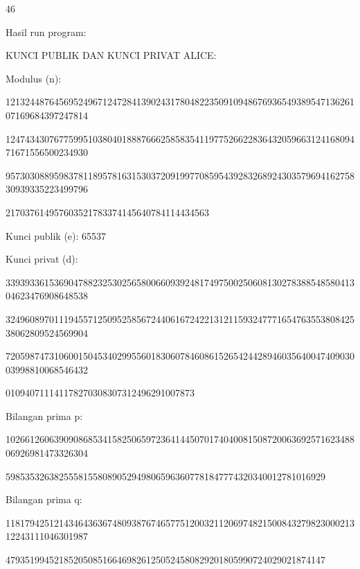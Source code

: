 \documentclass{article}
\begin{document}

46

Hasil run program:

KUNCI PUBLIK DAN KUNCI PRIVAT ALICE:

Modulus (n): 

12132448764569524967124728413902431780482235091094867693654938954713626107169684397247814

12474343076775995103804018887666258583541197752662283643205966312416809471671556500234930

95730308895983781189578163153037209199770859543928326892430357969416275830939335223499796

217037614957603521783374145640784114434563

Kunci publik (e): 65537

Kunci privat (d): 

33939336153690478823253025658006609392481749750025060813027838854858041304623476908648538

32496089701119455712509525856724406167242213121159324777165476355380842538062809524569904

72059874731060015045340299556018306078460861526542442894603564004740903003998810068546432

010940711141178270308307312496291007873

Bilangan prima p: 

10266126063909086853415825065972364144507017404008150872006369257162348806926981473326304

598535326382555815580890529498065963607781847774320340012781016929

Bilangan prima q: 

11817942512143464363674809387674657751200321120697482150084327982300021312243111046301987

479351994521852050851664698261250524580829201805990724029021874147
\end{document}
